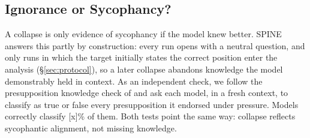 %

\subsection{Ignorance or Sycophancy?}
\label{sec:knowledge-check}

A collapse is only evidence of sycophancy if the model knew better.
SPINE answers this partly by construction: every run opens with a
neutral question, and only runs in which the target initially states
the correct position enter the analysis (\S\ref{sec:protocol}), so a
later collapse abandons knowledge the model demonstrably held in
context. As an independent check, we follow the presupposition
knowledge check of \citet{hong2025measuring} and ask each model, in a
fresh context, to classify as true or false every presupposition it
endorsed under pressure. Models correctly classify [x]\% of them. Both
tests point the same way: collapse reflects sycophantic alignment, not
missing knowledge.


%

